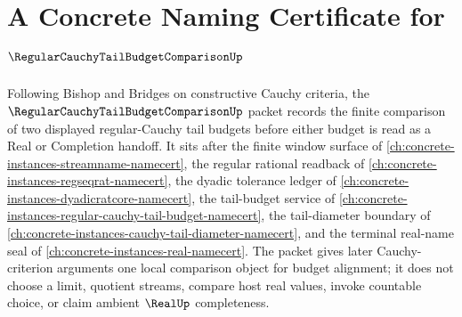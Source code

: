 \chapter{A Concrete Naming Certificate for $\RegularCauchyTailBudgetComparisonUp$}
\label{ch:concrete-instances-regular-cauchy-tail-budget-comparison-namecert}

Following Bishop and Bridges on constructive Cauchy criteria, the $\RegularCauchyTailBudgetComparisonUp$ packet records the finite comparison of two displayed regular-Cauchy tail budgets before either budget is read as a Real or Completion handoff. It sits after the finite window surface of \autoref{ch:concrete-instances-streamname-namecert}, the regular rational readback of \autoref{ch:concrete-instances-regseqrat-namecert}, the dyadic tolerance ledger of \autoref{ch:concrete-instances-dyadicratcore-namecert}, the tail-budget service of \autoref{ch:concrete-instances-regular-cauchy-tail-budget-namecert}, the tail-diameter boundary of \autoref{ch:concrete-instances-cauchy-tail-diameter-namecert}, and the terminal real-name seal of \autoref{ch:concrete-instances-real-namecert}. The packet gives later Cauchy-criterion arguments one local comparison object for budget alignment; it does not choose a limit, quotient streams, compare host real values, invoke countable choice, or claim ambient $\RealUp$ completeness.

